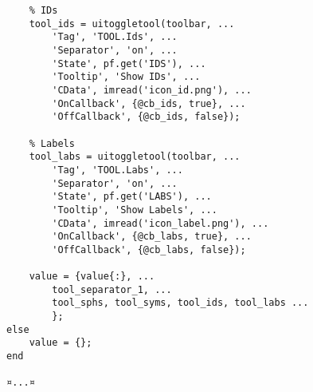 \documentclass{tufte-handout}
\begin{document}
\begin{lstlisting}
    % IDs
    tool_ids = uitoggletool(toolbar, ...
        'Tag', 'TOOL.Ids', ...
        'Separator', 'on', ...
        'State', pf.get('IDS'), ...
        'Tooltip', 'Show IDs', ...
        'CData', imread('icon_id.png'), ...
        'OnCallback', {@cb_ids, true}, ...
        'OffCallback', {@cb_ids, false});

    % Labels
    tool_labs = uitoggletool(toolbar, ...
        'Tag', 'TOOL.Labs', ...
        'Separator', 'on', ...
        'State', pf.get('LABS'), ...
        'Tooltip', 'Show Labels', ...
        'CData', imread('icon_label.png'), ...
        'OnCallback', {@cb_labs, true}, ...
        'OffCallback', {@cb_labs, false});
    
    value = {value{:}, ...
        tool_separator_1, ...
        tool_sphs, tool_syms, tool_ids, tool_labs ...
        };
else
	value = {};
end

¤...¤
\end{lstlisting}

%
%
\end{document}
